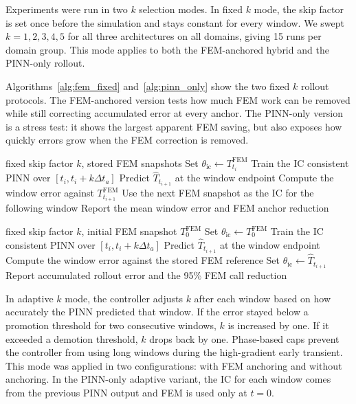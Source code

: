 Experiments were run in two $k$ selection modes.
In fixed $k$ mode, the skip factor is set once before the simulation and stays
constant for every window.
We swept $k=1,2,3,4,5$ for all three architectures on all domains, giving
15 runs per domain group.
This mode applies to both the FEM-anchored hybrid and the PINN-only rollout.

Algorithms~\ref{alg:fem_fixed} and~\ref{alg:pinn_only} show the two fixed $k$
rollout protocols.
The FEM-anchored version tests how much FEM work can be removed while still
correcting accumulated error at every anchor.
The PINN-only version is a stress test: it shows the largest apparent FEM
saving, but also exposes how quickly errors grow when the FEM correction is
removed.

\begin{algorithm}[H]
\caption{FEM-anchored fixed $k$ MSWP}
\label{alg:fem_fixed}
\begin{algorithmic}[1]
\Require fixed skip factor $k$,\; stored FEM snapshots
    \State Set $\theta_\mathrm{ic} \leftarrow T^\mathrm{FEM}_{t_i}$
    \State Train the IC consistent PINN over $[t_i,t_i+k\Delta t_a]$
    \State Predict $\hat{T}_{t_{i+1}}$ at the window endpoint
    \State Compute the window error against $T^\mathrm{FEM}_{t_{i+1}}$
    \State Use the next FEM snapshot as the IC for the following window
\EndFor
\State Report the mean window error and FEM anchor reduction
\end{algorithmic}
\end{algorithm}

\begin{algorithm}[H]
\caption{PINN-only fixed $k$ rollout}
\label{alg:pinn_only}
\begin{algorithmic}[1]
\Require fixed skip factor $k$,\; initial FEM snapshot $T^\mathrm{FEM}_{0}$
\State Set $\theta_\mathrm{ic} \leftarrow T^\mathrm{FEM}_{0}$
    \State Train the IC consistent PINN over $[t_i,t_i+k\Delta t_a]$
    \State Predict $\hat{T}_{t_{i+1}}$ at the window endpoint
    \State Compute the window error against the stored FEM reference
    \State Set $\theta_\mathrm{ic} \leftarrow \hat{T}_{t_{i+1}}$
\EndFor
\State Report accumulated rollout error and the 95\% FEM call reduction
\end{algorithmic}
\end{algorithm}

In adaptive $k$ mode, the controller adjusts $k$ after each window based on
how accurately the PINN predicted that window.
If the error stayed below a promotion threshold for two consecutive windows,
$k$ is increased by one.
If it exceeded a demotion threshold, $k$ drops back by one.
Phase-based caps prevent the controller from using long windows during the
high-gradient early transient.
This mode was applied in two configurations: with FEM anchoring and without
anchoring.
In the PINN-only adaptive variant, the IC for each window comes from the
previous PINN output and FEM is used only at $t=0$.

